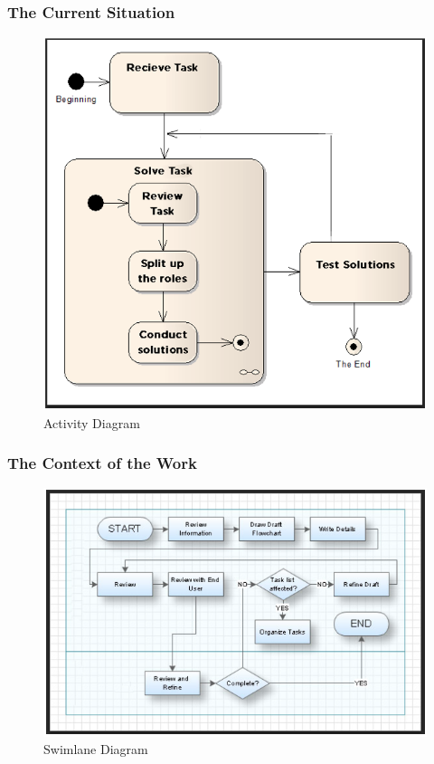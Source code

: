 \documentclass[11pt, oneside]{article}   	%
\begin{document}
\subsubsection{The Current Situation}
\begin{figure}[H] %
   \centering
   \includegraphics[width=6in]{ActivityDiagram.png} 
   \caption{Activity Diagram}
   \label{fig:example}
\end{figure}


\subsubsection{The Context of the Work}
\begin{figure}[H] %
   \centering
   \includegraphics[width=6in]{Swimlane.png} 
   \caption{Swimlane Diagram}
   \label{fig:example}
\end{figure}
\end{document}
